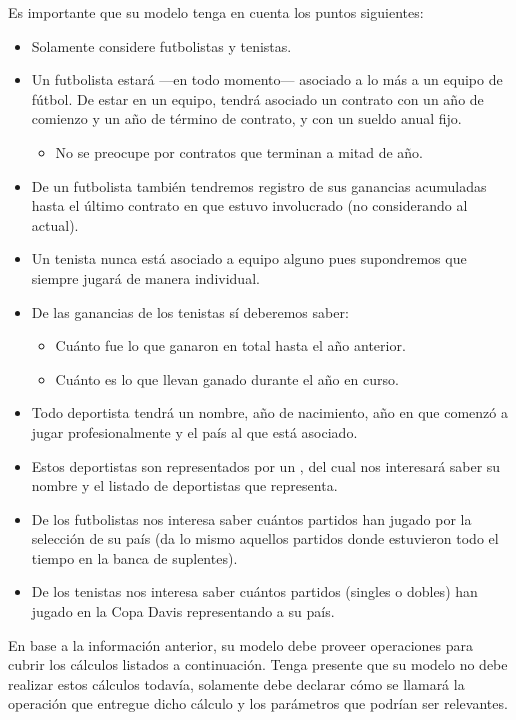 \documentclass[11pt,letterpaper]{article}
\begin{document}
\begin{spacing}{1.2}
\begin{Problem}
Es importante que su modelo tenga en cuenta los puntos siguientes:
\begin{itemize}
    \item Solamente considere futbolistas y tenistas.
    \item Un futbolista estará ---en todo momento--- asociado a lo más a un equipo
        de fútbol. De estar en un equipo, tendrá asociado un contrato con un año de comienzo
        y un año de término de contrato, y con un sueldo anual fijo.
        \begin{itemize}
            \item No se preocupe por contratos que terminan a mitad de año.
        \end{itemize}
    \item De un futbolista también tendremos registro de sus ganancias acumuladas hasta el último
        contrato en que estuvo involucrado (no considerando al actual).
    \item Un tenista nunca está asociado a equipo alguno pues supondremos que siempre
        jugará de manera individual.
    \item De las ganancias de los tenistas sí deberemos saber:
    \begin{itemize}
        \item Cuánto fue lo que ganaron en total hasta el año anterior.
        \item Cuánto es lo que llevan ganado durante el año en curso.
    \end{itemize}
    \item Todo deportista tendrá un nombre, año de nacimiento, año en que comenzó a jugar profesionalmente
        y el país al que está asociado.
    \item Estos deportistas son representados por un , del cual nos interesará
        saber su nombre y el listado de deportistas que representa.
    \item De los futbolistas nos interesa saber cuántos partidos han jugado por la selección de su país (da
        lo mismo aquellos partidos donde estuvieron todo el tiempo en la banca de suplentes).
    \item De los tenistas nos interesa saber cuántos partidos (singles o dobles) han jugado en la Copa Davis
        representando a su país.
\end{itemize}

En base a la información anterior, su modelo debe proveer operaciones para cubrir los cálculos listados a continuación.
Tenga presente que su modelo no debe realizar estos cálculos todavía, solamente debe declarar cómo se
llamará la operación que entregue dicho cálculo y los parámetros que podrían ser relevantes.


\end{Problem}
\end{spacing}
\end{document}
